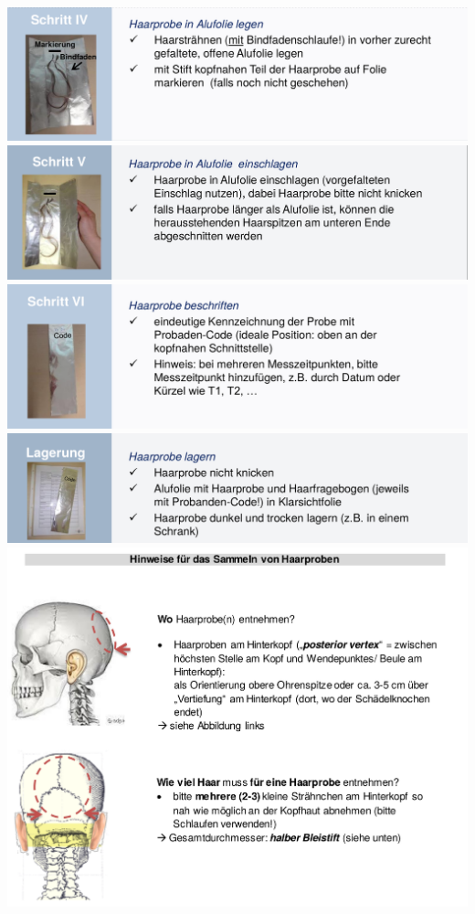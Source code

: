 \includegraphics[width=\textwidth]{./media/SOP_Haarprobe_Entnahme_6.png}
\includegraphics[width=\textwidth]{./media/SOP_Haarprobe_Entnahme_7.png}
\includegraphics[width=\textwidth]{./media/SOP_Haarprobe_Entnahme_8.png}
\includegraphics[width=\textwidth]{./media/SOP_Haarprobe_Entnahme_9.png}
\includegraphics[width=\textwidth]{./media/SOP_Haarprobe_Hinweise_1.png}
